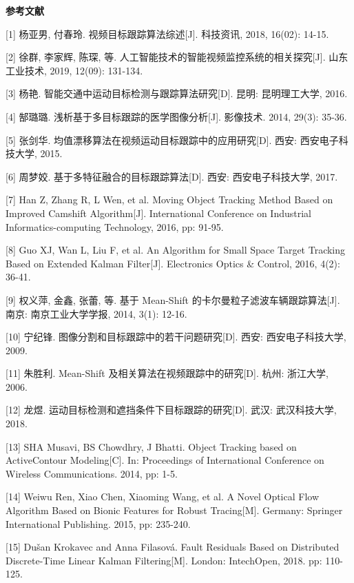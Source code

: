 \documentclass[
]{article}
\begin{document}
\textbf{\hfill\break
}\protect{}\label{_Toc26992}{}\textbf{参考文献}

{[}1{]} 杨亚男, 付春玲. 视频目标跟踪算法综述{[}J{]}. 科技资讯, 2018,
16(02): 14-15.

{[}2{]} 徐群, 李家辉, 陈琛, 等.
人工智能技术的智能视频监控系统的相关探究{[}J{]}. 山东工业技术, 2019,
12(09): 131-134.

{[}3{]} 杨艳. 智能交通中运动目标检测与跟踪算法研究{[}D{]}. 昆明:
昆明理工大学, 2016.

{[}4{]} 郜璐璐. 浅析基于多目标跟踪的医学图像分析{[}J{]}. 影像技术. 2014,
29(3): 35-36.

{[}5{]} 张剑华. 均值漂移算法在视频运动目标跟踪中的应用研究{[}D{]}. 西安:
西安电子科技大学, 2015.

{[}6{]} 周梦姣. 基于多特征融合的目标跟踪算法{[}D{]}. 西安:
西安电子科技大学, 2017.

{[}7{]} Han Z, Zhang R, L Wen, et al. Moving Object Tracking Method
Based on Improved Camshift Algorithm{[}J{]}. International Conference on
Industrial Informatics-computing Technology, 2016, pp: 91-95.

{[}8{]} Guo XJ, Wan L, Liu F, et al. An Algorithm for Small Space Target
Tracking Based on Extended Kalman Filter{[}J{]}. Electronics Optics \&
Control, 2016, 4(2): 36-41.

{[}9{]} 权义萍, 金鑫, 张蕾, 等. 基于 Mean-Shift
的卡尔曼粒子滤波车辆跟踪算法{[}J{]}. 南京: 南京工业大学学报, 2014, 3(1):
12-16.

{[}10{]} 宁纪锋. 图像分割和目标跟踪中的若干问题研究{[}D{]}. 西安:
西安电子科技大学, 2009.

{[}11{]} 朱胜利. Mean-Shift 及相关算法在视频跟踪中的研究{[}D{]}. 杭州:
浙江大学, 2006.

{[}12{]} 龙煜. 运动目标检测和遮挡条件下目标跟踪的研究{[}D{]}. 武汉:
武汉科技大学, 2018.

{[}13{]} SHA Musavi, BS Chowdhry, J Bhatti. Object Tracking based on
ActiveContour Modeling{[}C{]}. In: Proceedings of International
Conference on Wireless Communications. 2014, pp: 1-5.

{[}14{]} Weiwu Ren, Xiao Chen, Xiaoming Wang, et al. A Novel Optical
Flow Algorithm Based on Bionic Features for Robust Tracing{[}M{]}.
Germany: Springer International Publishing. 2015, pp: 235-240.

{[}15{]} Dušan Krokavec and Anna Filasová. Fault Residuals Based on
Distributed Discrete-Time Linear Kalman Filtering{[}M{]}. London:
IntechOpen, 2018. pp: 110-125.
\end{document}
